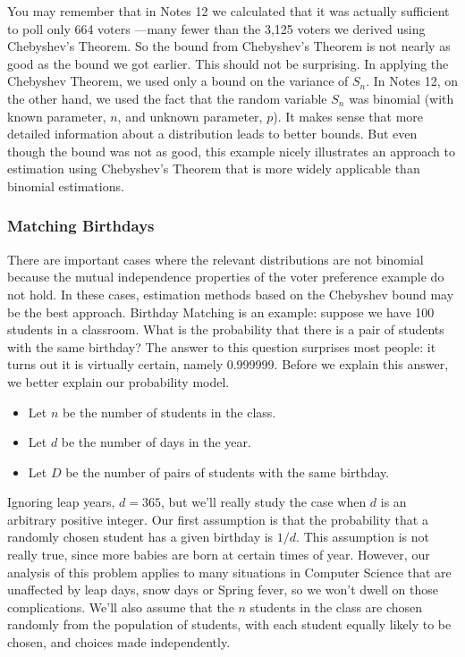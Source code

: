 You may remember that in Notes 12 we calculated that it was actually
sufficient to poll only 664 voters ---many fewer than the 3,125 voters we
derived using Chebyshev's Theorem.  So the bound from Chebyshev's Theorem
is not nearly as good as the bound we got earlier.  This should not be
surprising.  In applying the Chebyshev Theorem, we used only a bound on
the variance of $S_n$.  In Notes 12, on the other hand, we used the fact
that the random variable $S_n$ was binomial (with known parameter, $n$,
and unknown parameter, $p$).  It makes sense that more detailed
information about a distribution leads to better bounds.  But even though
the bound was not as good, this example nicely illustrates an approach to
estimation using Chebyshev's Theorem that is more widely applicable than
binomial estimations.

\subsubsection{Matching Birthdays}

There are important cases where the relevant distributions are not binomial
because the mutual independence properties of the voter preference example
do not hold.  In these cases, estimation methods based on the Chebyshev
bound may be the best approach.  Birthday Matching is an example: suppose
we have 100 students in a classroom.  What is the probability that there is
a pair of students with the same birthday?  The answer to this question
surprises most people: it turns out it is virtually certain, namely
0.999999.  Before we explain this answer, we better explain our probability
model.

\begin{itemize}

\item Let $n$ be the number of students in the class.

\item Let $d$ be the number of days in the year.

\item Let $D$ be the number of pairs of students with the same birthday.

\end{itemize}

Ignoring leap years, $d= 365$, but we'll really study the case when $d$ is
an arbitrary positive integer.  Our first assumption is that the
probability that a randomly chosen student has a given birthday is $1/d$.
This assumption is not really true, since more babies are born at certain
times of year.  However, our analysis of this problem applies to many
situations in Computer Science that are unaffected by leap days, snow days
or Spring fever, so we won't dwell on those complications.  We'll also
assume that the $n$ students in the class are chosen randomly from the
population of students, with each student equally likely to be chosen, and
choices made independently.

